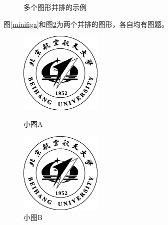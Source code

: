 \begin{figure}[htb]
\begin{center}
    \hspace{7em}
    \caption{多个图形并排的示例}
    \label{subfig1}
\end{center}
\end{figure}

图\ref{minifiga}和图\ref{minifigb}为两个并排的图形，各自均有图题。

\begin{figure}[htb]
\begin{minipage}{0.5\textwidth}
    \centering
    \includegraphics[width=0.35\textwidth]{figure/buaamark.eps}
    \caption{小图A}
    \label{minifiga}
\end{minipage}
\begin{minipage}{0.5\textwidth}
    \centering
    \includegraphics[width=0.35\textwidth]{figure/buaamark.eps}
    \caption{小图B}
    \label{minifigb}
\end{minipage}
\end{figure}

